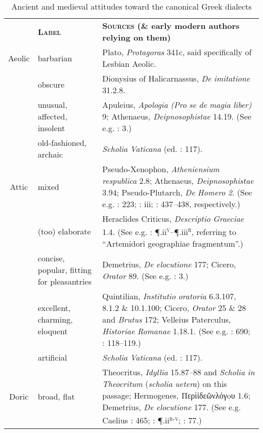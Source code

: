 \begin{table}
\caption{Ancient and medieval attitudes toward the canonical Greek dialects}
 
\begin{tabularx}{\textwidth}{XXX}
\lsptoprule

\multicolumn{1}{c}{\textbf{\textsc{Dialect}}} & \textbf{\textsc{Label}} & \textbf{\textsc{Sources} \textbf{(\&} \textbf{early} \textbf{modern} \textbf{authors} \textbf{relying} \textbf{on} \textbf{them)}}\\
\multicolumn{1}{c}{Aeolic} & barbarian & Plato, \textit{Protagoras} 341c, said specifically of Lesbian Aeolic.\\
& obscure & Dionysius of Halicarnassus, \textit{De} \textit{imitatione} 31.2.8.\\
 & unusual, affected, insolent & Apuleius, \textit{Apologia} \textit{(Pro} \textit{se} \textit{de} \textit{magia} \textit{liber)} 9; Athenaeus, \textit{Deipnosophistae} 14.19. (See e.g. \citealt{MuntheHeiberg1748}: 3.)\\
 & old-fashioned, archaic & \textit{Scholia} \textit{Vaticana} (ed. \citealt{Hilgard1901}: 117).\\
\multicolumn{1}{c}{Attic} & mixed & Pseudo-Xenophon, \textit{Atheniensium} \textit{respublica} 2.8; Athenaeus, \textit{Deipnosophistae} 3.94; Pseudo-Plutarch, \textit{De} \textit{Homero} \textit{2}. (See e.g. \citealt{Schwartz1721}: 223; \citealt{Maittaire1706}: iii; \citealt{Saumaise1643a}: 437–438, respectively.)\\
& (too) elaborate & Heraclides Criticus, \textit{Descriptio} \textit{Graeciae} 1.4. (See e.g. \citealt{Estienne1573}: ¶.ii\textsc{\textsuperscript{v}}–¶.iii\textsc{\textsuperscript{r}}, referring to “Artemidori geographiae fragmentum”.)\\
 & concise, popular, fitting for pleasantries & Demetrius, \textit{De} \textit{elocutione} 177; Cicero, \textit{Orator} 89. (See e.g. \citealt{MuntheHeiberg1748}: 3.)\\
 & excellent, charming, eloquent & Quintilian, \textit{Institutio} \textit{oratoria} 6.3.107, 8.1.2 \& 10.1.100; Cicero, \textit{Orator} 25 \& 28 and \textit{Brutus} 172; Velleius Paterculus, \textit{Historiae} \textit{Romanae} 1.18.1. (See e.g. \citealt{Duret1613}: 690; \citealt{Rollin1726}: 118–119.)\\
 & artificial & \textit{Scholia} \textit{Vaticana} (ed. \citealt{Hilgard1901}: 117).\\
\multicolumn{1}{c}{Doric} & broad, flat & Theocritus, \textit{Idyllia} 15.87–88 and \textit{Scholia} \textit{in} \textit{Theocritum} (\textit{scholia} \textit{uetera}) on this passage; Hermogenes, Περὶἰδεῶνλόγoυ 1.6; Demetrius, \textit{De} \textit{elocutione} 177. (See e.g. Caelius \citealt{Rhodiginus1542}: 465; \citealt{Estienne1573}: ¶.ii\textsc{\textsuperscript{r-v}}; \citealt{Saumaise1643a}: 77.)\\

\end{tabularx}
\end{table}
